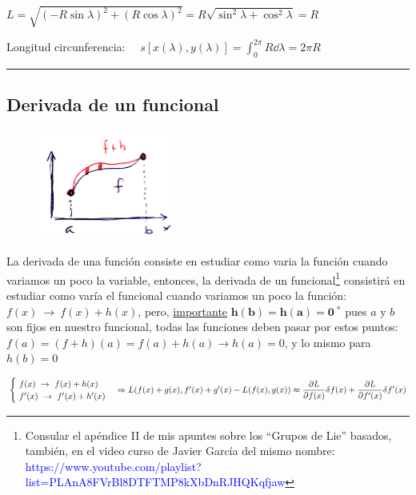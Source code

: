 \begin{small}
\textcolor{gris}{$L=\sqrt{(-R\sin \lambda)^2 + (R \cos \lambda)^2 }= R \sqrt{\sin^2 \lambda + \cos^2 \lambda}=R$}
 
 
\textcolor{gris}{Longitud circunferencia: $\quad s[x(\lambda), y(\lambda)]=\displaystyle \int_0^{2\pi} R \dd \lambda =2\pi R$}
 
 

\vspace{-5mm}
\begin{flushright}\rule{250pt}{0.1pt}\end{flushright}
\end{small}

\subsection{Derivada de un funcional}

\begin{multicols}{2}
\begin{figure}[H]
	\centering
	\includegraphics[width=0.4\textwidth]{imagenes/apendices-01-04.png}
\end{figure}	

La derivada de una función consiste en estudiar como varia la función cuando variamos un poco la variable, entonces, la derivada de un funcional\footnote{Consular el apéndice II de mis apuntes sobre los “Grupos de Lie” basados, también, en el video curso de Javier García del mismo nombre:
\textcolor{blue}{https://www.youtube.com/playlist?list=PLAnA8FVrBl8DTFTMP8kXbDnRJHQKqfjaw}}
 consistirá en estudiar como varía el funcional cuando variamos un poco la función: $f(x) \ \to \ f(x)+h(x)$, pero, \underline{importante} $ \boldsymbol{ h(b)=h(a)=0} \ ^*$ pues $a \text{ y } b$ son fijos en nuestro funcional, todas las funciones deben pasar por estos puntos: $f(a)=(f+h)(a)=f(a)+h(a)\to h(a)=0$, y lo mismo para $h(b)=0$
\end{multicols}

$\begin{cases}\ f(x) \ \to \ f(x)+h(x) \\ \ f'(x) \ \to \ f'(x)+h'(x) \end{cases} \Rightarrow
L(f(x)+g(x),f'(x)+g'(x)-L(f(x),g(x))\approx \displaystyle \pdv{L}{f(x)}\delta f(x)+\pdv{L}{f'(x)}\delta f'(x)$


